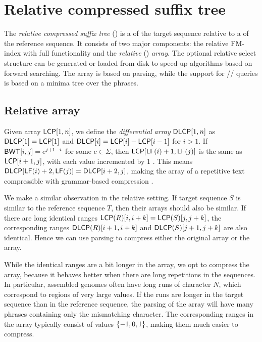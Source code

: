 
\section{Relative compressed suffix tree}

The \emph{relative compressed suffix tree} (\RCST) is a \CSTnpr{} of the
target sequence relative to a \CST{} of the reference sequence. It consists of
two major components: the relative FM-index with full functionality and the
\emph{relative} \LCP{} (\RLCP) \emph{array}. The optional relative select
structure can be generated or loaded from disk to speed up algorithms based on
forward searching. The \RLCP{} array is based on \RLZ{} parsing, while the
support for \nsv/\psv/\rmq{} queries is based on a minima tree over the
phrases.

\subsection{Relative \LCP{} array}

Given \LCP{} array $\mathsf{LCP}[1,n]$, we define the \emph{differential} \LCP{}
\emph{array} $\mathsf{DLCP}[1,n]$ as $\mathsf{DLCP}[1] = \mathsf{LCP}[1]$ and $\mathsf{DLCP}[i] = \mathsf{LCP}[i]
- \mathsf{LCP}[i-1]$ for $i > 1$. If $\mathsf{BWT}[i,j] = c^{j+1-i}$ for some $c \in
\Sigma$, then $\mathsf{LCP}[\mathsf{LF}(i)+1,\mathsf{LF}(j)]$ is the same as $\mathsf{LCP}[i+1,j]$, with
each value incremented by $1$ \cite{Fischer2009a}. This means
$\mathsf{DLCP}[\mathsf{LF}(i)+2,\mathsf{LF}(j)] = \mathsf{DLCP}[i+2,j]$, making the \DLCP{} array of a
repetitive text compressible with grammar-based compression
\cite{Abeliuk2013}.

We make a similar observation in the relative setting. If target sequence $S$
is similar to the reference sequence $T$, then their \LCP{} arrays should also
be similar. If there are long identical ranges $\mathsf{LCP}(R)[i,i+k] =
\mathsf{LCP}(S)[j,j+k]$, the corresponding \DLCP{} ranges $\mathsf{DLCP}(R)[i+1,i+k]$ and
$\mathsf{DLCP}(S)[j+1,j+k]$ are also identical. Hence we can use \RLZ{} parsing to
compress either the original \LCP{} array or the \DLCP{} array.

While the identical ranges are a bit longer in the \LCP{} array, we opt to
compress the \DLCP{} array, because it behaves better when there are long
repetitions in the sequences. In particular, assembled genomes often have long
runs of character $N$, which correspond to regions of very large \LCP{}
values. If the runs are longer in the target sequence than in the reference
sequence, the \RLZ{} parsing of the \LCP{} array will have many phrases
containing only the mismatching character. The corresponding ranges in the
\DLCP{} array typically consist of values $\{ -1, 0, 1 \}$, making them much
easier to compress.

